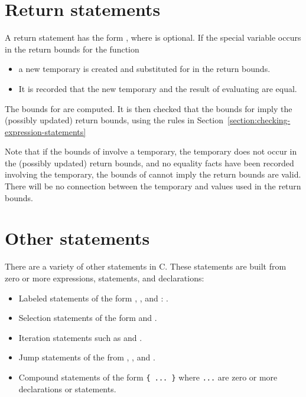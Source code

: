  \section{Return statements}
 \label{section:checking-return-statements}

A return statement has the form  , where 
is optional. If the special
variable  occurs in the return bounds
for the function
\begin{itemize}
\item a new temporary is created and substituted for
 in the return bounds.
\item  It is recorded that the new temporary and the result
of evaluating  are equal.
\end{itemize}
The bounds for  are computed.   It is then checked that
the bounds for  imply the (possibly updated) return
bounds, using  the rules in 
Section~\ref{section:checking-expression-statements}

Note that if the bounds of  involve a temporary,
the temporary does not occur in the (possibly updated) return bounds,
and no equality facts have been recorded involving the temporary,
the bounds of  cannot imply the return bounds are
valid.  There will be no connection between the temporary
and values used in the return bounds.

\section{Other statements}

There are a variety of other statements in C. These statements are built
from zero or more expressions, statements, and declarations:

\begin{itemize}
\item
  Labeled statements of the form 
   \code{:} ,
   , and  :
  .
\item
  Selection statements of the form \code{)} 
   
   and \code{)}
  .
\item
  Iteration statements such as \code{)}
   and 
  \code{;}  \code{;} 
   \code{)} .
\item
  Jump statements of the from  ,
  , and .
\item
  Compound statements of the form \lstinline|{ ... }| where \lstinline|...|
  are zero or more declarations or statements.
\end{itemize}

